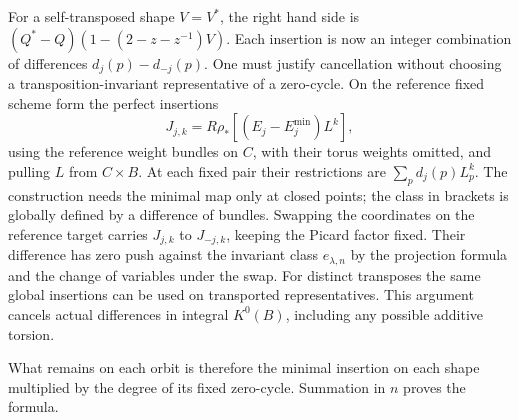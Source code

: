 For a self-transposed shape $V=V^*$, the right hand side is $(Q^*-Q)(1-(2-z-z^{-1})V)$. Each insertion is now an integer combination of differences $d_j(p)-d_{-j}(p)$. One must justify cancellation without choosing a transposition-invariant representative of a zero-cycle. On the reference fixed scheme form the perfect insertions
\[
J_{j,k}=R\rho_*[(E_j-E^{\min}_j)L^k],
\]
using the reference weight bundles on $C$, with their torus weights omitted, and pulling $L$ from $C\times B$. At each fixed pair their restrictions are $\sum_p d_j(p)L_p^k$. The construction needs the minimal map only at closed points; the class in brackets is globally defined by a difference of bundles. Swapping the coordinates on the reference target carries $J_{j,k}$ to $J_{-j,k}$, keeping the Picard factor fixed. Their difference has zero push against the invariant class $e_{\lambda,n}$ by the projection formula and the change of variables under the swap. For distinct transposes the same global insertions can be used on transported representatives. This argument cancels actual differences in integral $K^0(B)$, including any possible additive torsion.

What remains on each orbit is therefore the minimal insertion on each shape multiplied by the degree of its fixed zero-cycle. Summation in $n$ proves the formula.
